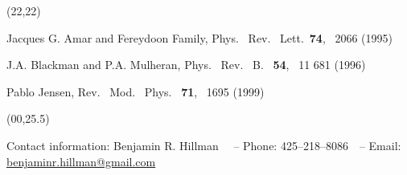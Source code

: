 \documentclass{article}
\renewcommand{\footnotesize}{\fontsize{17.28}{22}\selectfont}
\renewcommand{\small}{\fontsize{20.74}{25}\selectfont}
\begin{document}
\begin{textblock}{10}(22,22)
\small
\begin{thebibliography}{99}
	Jacques G. Amar and Fereydoon Family,
	Phys. \ Rev. \ Lett.\ {\bf 74}, \ 2066 (1995)

	J.A. Blackman and P.A. Mulheran,
	Phys. \ Rev. \ B. \ {\bf 54}, \ 11 681 (1996)

	Pablo Jensen,
	Rev. \ Mod. \ Phys. \ {\bf 71}, \ 1695 (1999)
\end{thebibliography}
\end{textblock}

\begin{textblock}{54}(00,25.5)
\begin{center}
{\footnotesize Contact information:
Benjamin R. Hillman \ \ --
Phone: 425--218--8086\ \ --
Email: \url{benjaminr.hillman@gmail.com}
}
\end{center}
\end{textblock}
\end{document}
